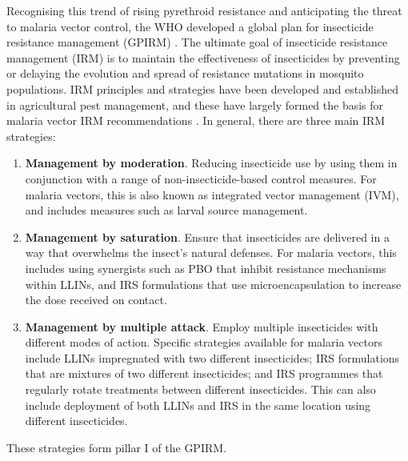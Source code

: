 \documentclass[a4paper,11pt,abstracton,hidelinks]{scrartcl}
\begin{document}
Recognising this trend of rising pyrethroid resistance and anticipating the threat to malaria vector control, the WHO developed a global plan for insecticide resistance management (GPIRM) \citep{WHO2012GPIRM}. 
%
The ultimate goal of insecticide resistance management (IRM) is to maintain the effectiveness of insecticides by preventing or delaying the evolution and spread of resistance mutations in mosquito populations. 
%
IRM principles and strategies have been developed and established in agricultural pest management, and these have largely formed the basis for malaria vector IRM recommendations \citep{Georghiou2005,Sternberg2018}. 
%
In general, there are three main IRM strategies:
%
\begin{enumerate}
%
\item \textbf{Management by moderation}. Reducing insecticide use by using them in conjunction with a range of non-insecticide-based control measures. For malaria vectors, this is also known as integrated vector management (IVM), and includes measures such as larval source management.
%
\item \textbf{Management by saturation}. Ensure that insecticides are delivered in a way that overwhelms the insect's natural defenses. For malaria vectors, this includes using synergists such as PBO that inhibit resistance mechanisms within LLINs, and  IRS formulations that use microencapsulation to increase the dose received on contact.
%
\item \textbf{Management by multiple attack}. Employ multiple insecticides with different modes of action. Specific strategies available for malaria vectors include LLINs impregnated with two different insecticides; IRS formulations that are mixtures of two different insecticides; and IRS programmes that regularly rotate treatments between different insecticides. This can also include deployment of both LLINs and IRS in the same location using different insecticides.
%
\end{enumerate}
%
These strategies form pillar \RN{1} of the GPIRM.
\end{document}
